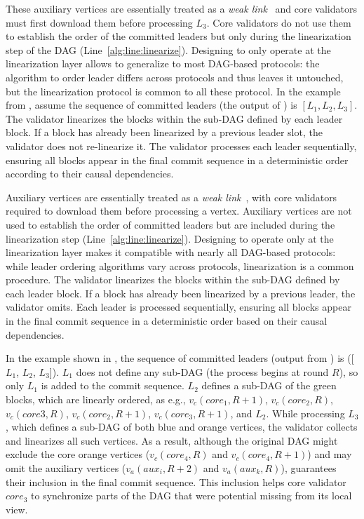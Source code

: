 These auxiliary vertices are essentially treated as a \emph{weak link}~\cite{dag-rider} and core validators must first download them before processing $L_3$. Core validators do not use them to establish the order of the committed leaders but only during the linearization step of the DAG (Line~\ref{alg:line:linearize}). Designing \sysname to only operate at the linearization layer allows \sysname to generalize to most DAG-based protocols: the algorithm to order leader differs across protocols and thus \sysname leaves it untouched, but the linearization protocol is common to all these protocol.
In the example from , assume the sequence of committed leaders (the output of ) is $[L_1, L_2, L_3]$. The validator linearizes the blocks within the sub-DAG defined by each leader block. If a block has already been linearized by a previous leader slot, the validator does not re-linearize it. The validator processes each leader sequentially, ensuring all blocks appear in the final commit sequence in a deterministic order according to their causal dependencies.

Auxiliary vertices are essentially treated as a \emph{weak link}~\cite{dag-rider}, with core validators required to download them before processing a vertex. Auxiliary vertices are not used to establish the order of committed leaders but are included during the linearization step (Line~\ref{alg:line:linearize}). Designing \sysname to operate only at the linearization layer makes it compatible with nearly all DAG-based protocols: while leader ordering algorithms vary across protocols, linearization is a common procedure. The validator linearizes the blocks within the sub-DAG defined by each leader block. If a block has already been linearized by a previous leader, the validator omits. Each leader is processed sequentially, ensuring all blocks appear in the final commit sequence in a deterministic order based on their causal dependencies.

In the example shown in , the sequence of committed leaders (output from ) is ([$L_1$, $L_2$, $L_3$]).
$L_{1}$ does not define any sub-DAG (the process begins at round $R$), so only $L_1$ is added to the commit sequence.
$L_{2}$ defines a sub-DAG of the green blocks, which are linearly ordered, as e.g., $v_c(core_1,R+1)$, $v_c(core_2,R)$, $v_c(core3,R)$, $v_c(core_2,R+1)$, $v_c(core_3,R+1)$, and $L_2$.
While processing $L_3$, which defines a sub-DAG of both blue and orange vertices, the validator collects and linearizes all such vertices. As a result, although the original DAG might exclude the core orange vertices ($v_c(core_4, R)$ and $v_c(core_4, R+1)$) and may omit the auxiliary vertices ($v_a(aux_i,R+2)$ and $v_a(aux_k,R)$), \sysname guarantees their inclusion in the final commit sequence. This inclusion helps core validator $core_3$ to synchronize parts of the DAG that were potential missing from its local view.

